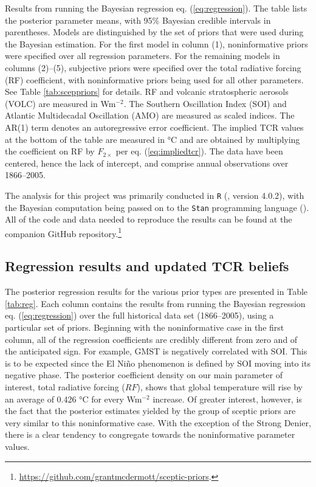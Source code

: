 \documentclass[smallextended]{svjour3}       %
\begin{document}
\begin{table}
\begin{threeparttable}
\begin{tablenotes}[para]
\item Results from running the Bayesian regression eq. (\ref{eq:regression}). The table lists the posterior parameter means, with 95\% Bayesian credible intervals in parentheses. Models are distinguished by the set of priors that were used during the Bayesian estimation. For the first model in column (1), noninformative priors were specified over all regression parameters. For the remaining models in columns (2)--(5), subjective priors were specified over the total radiative forcing (RF) coefficient, with noninformative priors being used for all other parameters. See Table \ref{tab:sceppriors} for details. RF and volcanic stratospheric aerosols (VOLC) are measured in Wm$^{-2}$. The Southern Oscillation Index (SOI) and Atlantic Multidecadal Oscillation (AMO) are measured as scaled indices. The AR(1) term denotes an autoregressive error coefficient. The implied TCR values at the bottom of the table are measured in °C and are obtained by multiplying the coefficient on RF by $F_{2\times}$ per eq. (\ref{eq:impliedtcr}). The data have been centered, hence the lack of intercept, and comprise annual observations over 1866--2005.
\end{tablenotes}
\end{threeparttable}
\end{table}

The analysis for this project was primarily conducted in \texttt{R}
(\cite{rcore}, version 4.0.2), with the Bayesian computation being
passed on to the \texttt{Stan} programming language (\cite{cmdstanr}).
All of the code and data needed to reproduce the results can be found at
the companion GitHub repository.\footnote{\url{https://github.com/grantmcdermott/sceptic-priors}.}

\hypertarget{sec:regression}{%
\subsection{Regression results and updated TCR
beliefs}\label{sec:regression}}

The posterior regression results for the various prior types are
presented in Table \ref{tab:reg}. Each column contains the results from
running the Bayesian regression eq. (\ref{eq:regression}) over the full
historical data set (1866--2005), using a particular set of priors.
Beginning with the noninformative case in the first column, all of the
regression coefficients are credibly different from zero and of the
anticipated sign. For example, GMST is negatively correlated with SOI.
This is to be expected since the El Niño phenomenon is defined by SOI
moving into its negative phase. The posterior coefficient density on our
main parameter of interest, total radiative forcing (\(RF\)), shows that
global temperature will rise by an average of 0.426 °C for every
Wm\(^{-2}\) increase. Of greater interest, however, is the fact that the
posterior estimates yielded by the group of sceptic priors are very
similar to this noninformative case. With the exception of the Strong
Denier, there is a clear tendency to congregate towards the
noninformative parameter values.
\end{document}

